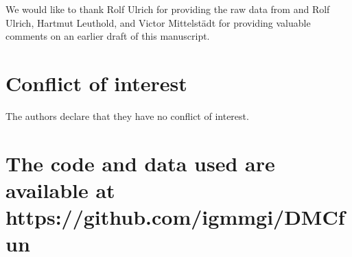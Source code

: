 \begin{acknowledgements}
    We would like to thank Rolf Ulrich for providing the raw data from
    \textcite{ulrich2015automatic} and Rolf Ulrich, Hartmut Leuthold, and Victor
    Mittelstädt for providing valuable comments on an earlier draft of this
    manuscript.
\end{acknowledgements}

\section*{Conflict of interest}
The authors declare that they have no conflict of interest.

\section*{The code and data used are available at https://github.com/igmmgi/DMCfun}

\printbibliography

